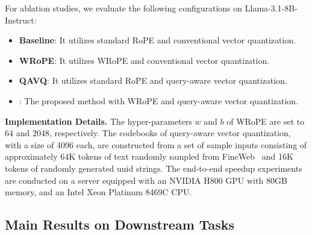 For ablation studies, we evaluate the following configurations on Llama-3.1-8B-Instruct:
\begin{itemize}[nosep]
    \item \textbf{Baseline}: It utilizes standard RoPE and conventional vector quantization.
    \item \textbf{WRoPE}: 
    It utilizes WRoPE and conventional vector quantization.
    \item \textbf{QAVQ}:
    It utilizes standard RoPE and query-aware vector quantization.
    \item \textbf{{\name}}: The proposed method with WRoPE and query-aware vector quantization.
\end{itemize}

\noindent \textbf{Implementation Details.}
The hyper-parameters \(w\) and \(b\) of WRoPE are set to \(64\) and \(2048\), respectively.
The codebooks of query-aware vector quantization, with a size of 4096 each, are constructed from a set of sample inputs consisting of approximately 64K tokens of text randomly sampled from FineWeb~\citep{fineweb} and 16K tokens of randomly generated uuid strings.
The end-to-end speedup experiments are conducted on a server equipped with an NVIDIA H800 GPU with 80GB memory, and an Intel Xeon Platinum 8469C CPU.

\subsection{Main Results on Downstream Tasks}


